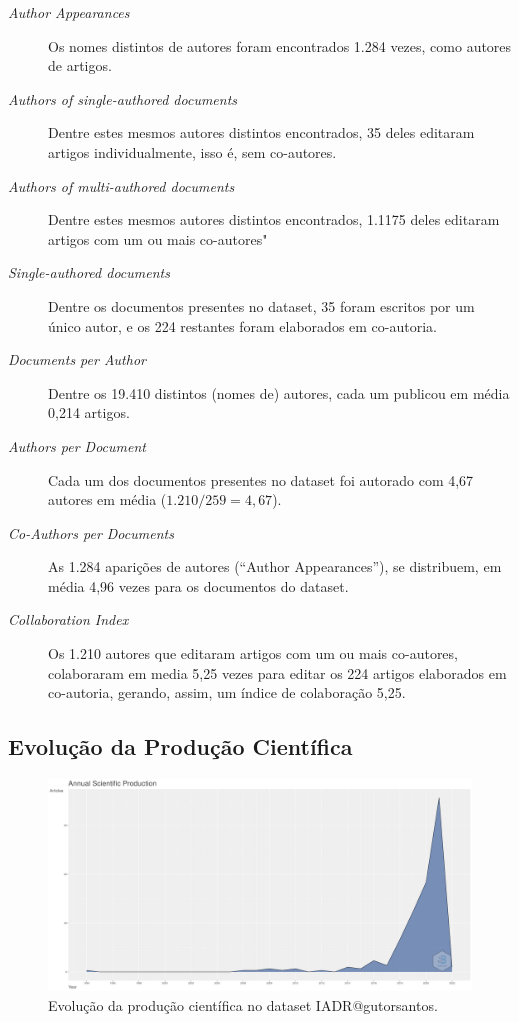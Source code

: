 \begin{description}
    \item [\textit{Author Appearances}] Os \totalAuthorsIADRgutorsantos{} nomes distintos de autores foram encontrados 1.284 vezes, como autores de artigos.
    \item [\textit{Authors of single-authored documents}] Dentre estes mesmos \totalAuthorsIADRgutorsantos{} autores distintos encontrados, 35 deles editaram artigos individualmente, isso é, sem co-autores.
    \item [\textit{Authors of multi-authored documents}] Dentre estes mesmos \totalAuthorsIADRgutorsantos{} autores distintos encontrados, 1.1175 deles editaram artigos com um ou mais co-autores"
    \item [\textit{Single-authored documents}] Dentre os \totalDocumentsIADRgutorsantos{}{} documentos presentes no dataset, 35 foram escritos por um único autor, e os 224 restantes foram elaborados em co-autoria.
    \item [\textit{Documents per Author}] Dentre os 19.410 distintos (nomes de) autores, cada um publicou em média 0,214 artigos.
    \item [\textit{Authors per Document}] Cada um dos \totalDocumentsIADRgutorsantos{} documentos presentes no dataset foi autorado com 4,67 autores em média ($1.210 / 259 = 4,67$).
    \item [\textit{Co-Authors per Documents}] As 1.284 aparições de autores (``Author Appearances''), se distribuem, em média 4,96 vezes para os \totalDocumentsIADRgutorsantos{} documentos do dataset.
    \item [\textit{Collaboration Index}] Os 1.210 autores que editaram artigos com um ou mais co-autores, colaboraram em media 5,25 vezes para editar os 224 artigos elaborados em co-autoria, gerando, assim, um índice de colaboração 5,25. 
\end{description}

\subsection{Evolução da Produção Científica}

\begin{figure}[H]
    \centering
    \includegraphics[width=1\textwidth]{experiments/gutorsantos/AnaliseBibliometrica/IAeDiscriminacao/imgs/AnnualScientificProduction-2022-02-09.png}
    \caption{Evolução da produção científica no dataset IADR@gutorsantos.}
    \label{fig:evol:anual:IADR@gutorsantos}
\end{figure}

